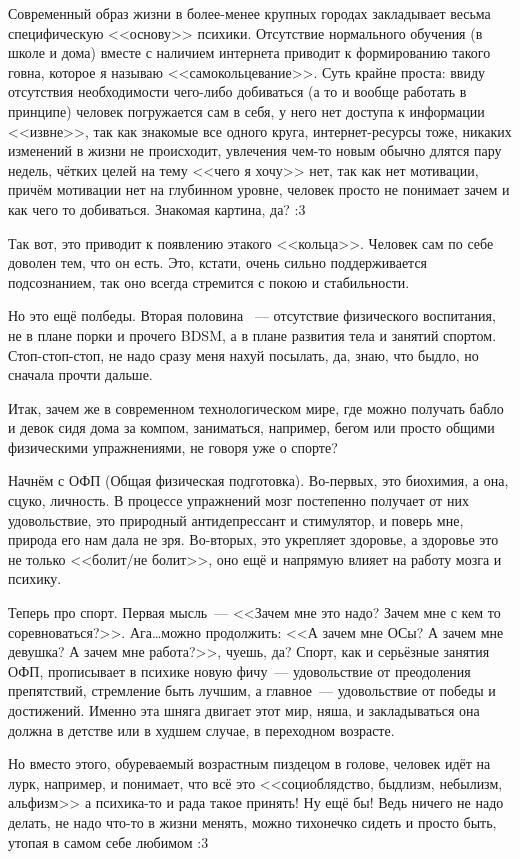 \documentclass[a4paper,14pt,oneside]{memoir}
\begin{document}
Современный образ жизни в более-менее крупных городах закладывает весьма специфическую <<основу>> психики. Отсутствие нормального обучения (в школе и дома) вместе с наличием интернета приводит к формированию такого говна, которое я называю <<самокольцевание>>. Суть крайне проста: ввиду отсутствия необходимости чего-либо добиваться (а то и вообще работать в принципе) человек погружается сам в себя, у него нет доступа к информации <<извне>>, так как знакомые все одного круга, интернет-ресурсы тоже, никаких изменений в жизни не происходит, увлечения чем-то новым обычно длятся пару недель, чётких целей на тему <<чего я хочу>> нет, так как нет мотивации, причём мотивации нет на глубинном уровне, человек просто не понимает зачем и как чего то добиваться. Знакомая картина, да? :3

Так вот, это приводит к появлению этакого <<кольца>>. Человек сам по себе доволен тем, что он есть. Это, кстати, очень сильно поддерживается подсознанием, так оно всегда стремится с покою и стабильности.

Но это ещё полбеды. Вторая половина ~--- отсутствие физического воспитания, не в плане порки и прочего BDSM, а в плане развития тела и занятий спортом. Стоп-стоп-стоп, не надо сразу меня нахуй посылать, да, знаю, что быдло, но сначала прочти дальше. 

Итак, зачем же в современном технологическом мире, где можно получать бабло и девок сидя дома за компом, заниматься, например, бегом или просто общими физическими упражнениями, не говоря уже о спорте?

Начнём с ОФП (Общая физическая подготовка). Во-первых, это биохимия, а она, сцуко, личность. В процессе упражнений мозг постепенно получает от них удовольствие, это природный антидепрессант и стимулятор, и поверь мне, природа его нам дала не зря. Во-вторых, это укрепляет здоровье, а здоровье это не только <<болит/не болит>>, оно ещё и напрямую влияет на работу мозга и психику.

Теперь про спорт. Первая мысль~--- <<Зачем мне это надо? Зачем мне с кем то соревноваться?>>. Ага\ldots можно продолжить: <<А зачем мне ОСы? А зачем мне девушка? А зачем мне работа?>>, чуешь, да? Спорт, как и серьёзные занятия ОФП, прописывает в психике новую фичу~--- удовольствие от преодоления препятствий, стремление быть лучшим, а главное~--- удовольствие от победы и достижений. Именно эта шняга двигает этот мир, няша, и закладываться она должна в детстве или в худшем случае, в переходном возрасте.

Но вместо этого, обуреваемый возрастным пиздецом в голове, человек идёт на лурк, например, и понимает, что всё это <<социоблядство, быдлизм, небылизм, альфизм>> а психика-то и рада такое принять! Ну ещё бы! Ведь ничего не надо делать, не надо что-то в жизни менять, можно тихонечко сидеть и просто быть, утопая в самом себе любимом :3
\end{document}
